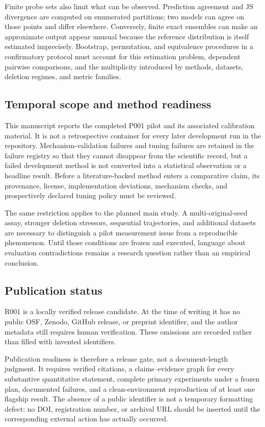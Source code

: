 Finite probe sets also limit what can be observed. Prediction agreement and JS divergence
are computed on enumerated partitions; two models can agree on those points and differ
elsewhere. Conversely, finite exact ensembles can make an approximate output appear
unusual because the reference distribution is itself estimated imprecisely. Bootstrap,
permutation, and equivalence procedures in a confirmatory protocol must account for this
estimation problem, dependent pairwise comparisons, and the multiplicity introduced by
methods, datasets, deletion regimes, and metric families.

\subsection{Temporal scope and method readiness}
This manuscript reports the completed P001 pilot and its associated calibration material.
It is not a retrospective container for every later development run in the repository.
Mechanism-validation failures and tuning failures are retained in the failure registry so
that they cannot disappear from the scientific record, but a failed development method is
not converted into a statistical observation or a headline result. Before a literature-backed
method enters a comparative claim, its provenance, license, implementation deviations,
mechanism checks, and prospectively declared tuning policy must be reviewed.

The same restriction applies to the planned main study. A multi-original-seed assay,
stronger deletion stressors, sequential trajectories, and additional datasets are necessary
to distinguish a pilot measurement issue from a reproducible phenomenon. Until those
conditions are frozen and executed, language about evaluation contradictions remains a
research question rather than an empirical conclusion.

\subsection{Publication status}
R001 is a locally verified release candidate. At the time of writing it has no public OSF,
Zenodo, GitHub release, or preprint identifier, and the author metadata still requires
human verification. These omissions are recorded rather than filled with invented
identifiers.

Publication readiness is therefore a release gate, not a document-length judgment. It
requires verified citations, a claims--evidence graph for every substantive quantitative
statement, complete primary experiments under a frozen plan, documented failures, and a
clean-environment reproduction of at least one flagship result. The absence of a public
identifier is not a temporary formatting defect: no DOI, registration number, or archival
URL should be inserted until the corresponding external action has actually occurred.
